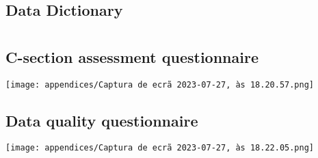 \chapter{} \label{ap1:loren}

\section{Data Dictionary}
\label{appendix:data_dict}


\chapter{} \label{ap2:loren}

\section{C-section assessment questionnaire}
\label{appendix:quest-obs}
%
\texttt{[image: appendices/Captura de ecrã 2023-07-27, às 18.20.57.png]}
\section{Data quality questionnaire}
\label{appendix:quest-dq}
%

\texttt{[image: appendices/Captura de ecrã 2023-07-27, às 18.22.05.png]}